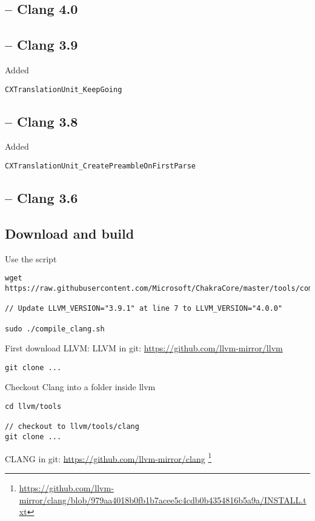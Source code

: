 \subsection{-- Clang 4.0}
\label{sec:clang-4.0}

\subsection{-- Clang 3.9}
\label{sec:clang-3.9}

Added
\begin{verbatim}
CXTranslationUnit_KeepGoing
\end{verbatim}


\subsection{-- Clang 3.8}
\label{sec:clang-3.8}

Added
\begin{verbatim}
CXTranslationUnit_CreatePreambleOnFirstParse
\end{verbatim}

\subsection{-- Clang 3.6}
\label{sec:clang-3.6}

\subsection{Download and build }
\label{sec:clang-install}

Use the script
\begin{verbatim}
wget https://raw.githubusercontent.com/Microsoft/ChakraCore/master/tools/compile_clang.sh

// Update LLVM_VERSION="3.9.1" at line 7 to LLVM_VERSION="4.0.0"

sudo ./compile_clang.sh
\end{verbatim}

First download LLVM: LLVM in git: \url{https://github.com/llvm-mirror/llvm}

\begin{verbatim}
git clone ...
\end{verbatim}

Checkout Clang into a folder inside llvm
\begin{verbatim}
cd llvm/tools

// checkout to llvm/tools/clang
git clone ... 
\end{verbatim}
CLANG in git: \url{https://github.com/llvm-mirror/clang}
\footnote{\url{https://github.com/llvm-mirror/clang/blob/979aa4018b0fb1b7acee5c4cdb0b4354816b5a9a/INSTALL.txt}}


